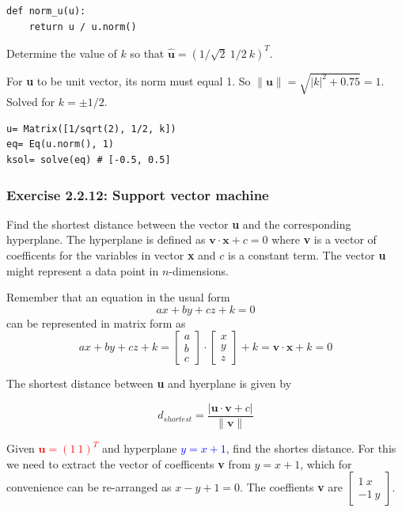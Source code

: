 \begin{verbatim}
def norm_u(u):
    return u / u.norm()
\end{verbatim}

Determine the value of $k$ so that $\mathbf{\hat{u}} = (1/\sqrt{2}\ 1/2\ k)^T$.

For \textbf{u} to be unit vector, its norm must equal 1. So $\mathbf{\|u\|} = \sqrt{\left\lvert{k}\right\rvert^{2} + 0.75} = 1$.
Solved for $k= \pm 1/2$.

\begin{verbatim}
u= Matrix([1/sqrt(2), 1/2, k])
eq= Eq(u.norm(), 1)
ksol= solve(eq) # [-0.5, 0.5]
\end{verbatim}

\subsubsection{Exercise 2.2.12: Support vector machine}

Find the shortest distance between the vector \textbf{u} and the corresponding
hyperplane. The hyperplane is defined as $\mathbf{v \cdot x} + c = 0$ where
\textbf{v} is a vector of coefficents for the variables in vector \textbf{x} and
$c$ is a constant term. The vector \textbf{u} might represent a data point in
$n$-dimensions.

Remember that an equation in the usual form
$$ax + by +cz + k = 0$$
can be represented in matrix form as
$$ax + by +cz + k
= \left[\begin{matrix}a\\b\\c\end{matrix}\right] \cdot \left[\begin{matrix}x\\y\\z\end{matrix}\right] + k
= \mathbf{v} \cdot \mathbf{x} + k
= 0$$

The shortest distance between \textbf{u} and hyerplane is given by

\begin{equation}\label{eq:ex2_2_12_svm}
d_{shortest} = \frac{|\mathbf{u \cdot v} + c|}{\|\mathbf{v}\|}
\end{equation}

Given \textcolor{red}{$\mathbf{u} = (1\ 1)^T$} and hyperplane \textcolor{blue}{$y= x + 1$}, find the shortes
distance. For this we need to extract the vector of coefficents \textbf{v} from $y= x + 1$, which for convenience can be
re-arranged as $x - y + 1 = 0$.
The coeffients \textbf{v} are $\left[\begin{matrix}1\ \mathit{x} \\ -1\ \mathit{y} \end{matrix}\right]$.

